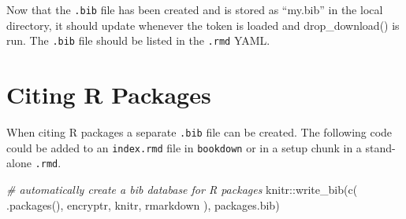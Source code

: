 \documentclass[
]{book}
\newenvironment{Shaded}{\begin{snugshade}}{\end{snugshade}}
\newcommand{\CommentTok}[1]{\textcolor[rgb]{0.56,0.35,0.01}{\textit{#1}}}
\newcommand{\FunctionTok}[1]{\textcolor[rgb]{0.00,0.00,0.00}{#1}}
\newcommand{\NormalTok}[1]{#1}
\newcommand{\SpecialCharTok}[1]{\textcolor[rgb]{0.00,0.00,0.00}{#1}}
\newcommand{\StringTok}[1]{\textcolor[rgb]{0.31,0.60,0.02}{#1}}
\begin{document}
Now that the \texttt{.bib} file has been created and is stored as ``my.bib'' in the local directory, it should update whenever the token is loaded and drop\_download() is run. The \texttt{.bib} file should be listed in the \texttt{.rmd} YAML.

\hypertarget{citing-r-packages}{%
\section{Citing R Packages}\label{citing-r-packages}}

When citing R packages a separate \texttt{.bib} file can be created. The following code could be added to an \texttt{index.rmd} file in \texttt{bookdown} or in a setup chunk in a stand-alone \texttt{.rmd}.

\begin{Shaded}
\begin{Highlighting}[]
\CommentTok{\# automatically create a bib database for R packages}
\NormalTok{knitr}\SpecialCharTok{::}\FunctionTok{write\_bib}\NormalTok{(}\FunctionTok{c}\NormalTok{(}
  \FunctionTok{.packages}\NormalTok{(), }\StringTok{\textquotesingle{}encryptr\textquotesingle{}}\NormalTok{, }\StringTok{\textquotesingle{}knitr\textquotesingle{}}\NormalTok{, }\StringTok{\textquotesingle{}rmarkdown\textquotesingle{}}
\NormalTok{), }\StringTok{\textquotesingle{}packages.bib\textquotesingle{}}\NormalTok{)}
\end{Highlighting}
\end{Shaded}


  
\end{document}
